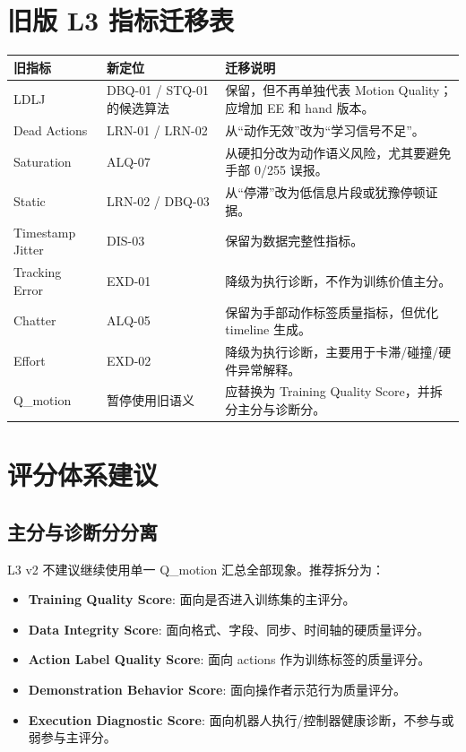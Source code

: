 \documentclass[UTF8,zihao=-4]{ctexart}
\newcommand{\Term}[1]{\textbf{#1}}
\begin{document}
\section{旧版 L3 指标迁移表}

\begin{longtable}{L{3.2cm} L{4.2cm} L{5.8cm}}
\toprule
旧指标 & 新定位 & 迁移说明 \\
\midrule
LDLJ & DBQ-01 / STQ-01 的候选算法 & 保留，但不再单独代表 Motion Quality；应增加 EE 和 hand 版本。 \\
Dead Actions & LRN-01 / LRN-02 & 从“动作无效”改为“学习信号不足”。 \\
Saturation & ALQ-07 & 从硬扣分改为动作语义风险，尤其要避免手部 0/255 误报。 \\
Static & LRN-02 / DBQ-03 & 从“停滞”改为低信息片段或犹豫停顿证据。 \\
Timestamp Jitter & DIS-03 & 保留为数据完整性指标。 \\
Tracking Error & EXD-01 & 降级为执行诊断，不作为训练价值主分。 \\
Chatter & ALQ-05 & 保留为手部动作标签质量指标，但优化 timeline 生成。 \\
Effort & EXD-02 & 降级为执行诊断，主要用于卡滞/碰撞/硬件异常解释。 \\
Q\_motion & 暂停使用旧语义 & 应替换为 Training Quality Score，并拆分主分与诊断分。 \\
\bottomrule
\end{longtable}

\section{评分体系建议}

\subsection{主分与诊断分分离}

L3 v2 不建议继续使用单一 Q\_motion 汇总全部现象。推荐拆分为：

\begin{itemize}
  \item \Term{Training Quality Score}: 面向是否进入训练集的主评分。
  \item \Term{Data Integrity Score}: 面向格式、字段、同步、时间轴的硬质量评分。
  \item \Term{Action Label Quality Score}: 面向 actions 作为训练标签的质量评分。
  \item \Term{Demonstration Behavior Score}: 面向操作者示范行为质量评分。
  \item \Term{Execution Diagnostic Score}: 面向机器人执行/控制器健康诊断，不参与或弱参与主评分。
\end{itemize}
\end{document}
